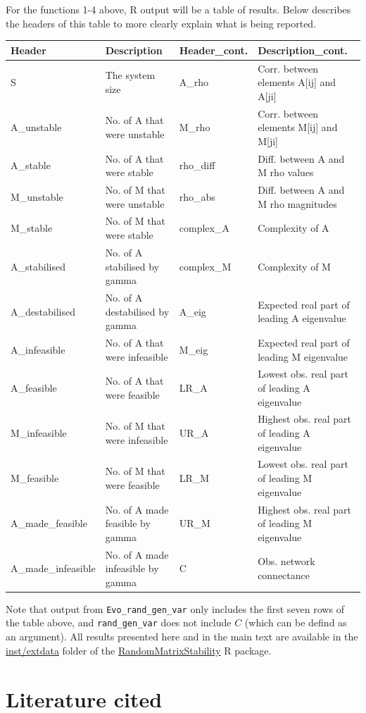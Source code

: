 \documentclass[]{article}
\begin{document}
For the functions 1-4 above, R output will be a table of results. Below
describes the headers of this table to more clearly explain what is
being reported.

\footnotesize

\begin{longtable}[]{@{}llll@{}}
\toprule
Header & Description & Header\_cont. & Description\_cont.\tabularnewline
\midrule
\endhead
S & The system size & A\_rho & Corr. between elements A{[}ij{]} and
A{[}ji{]}\tabularnewline
A\_unstable & No. of A that were unstable & M\_rho & Corr. between
elements M{[}ij{]} and M{[}ji{]}\tabularnewline
A\_stable & No. of A that were stable & rho\_diff & Diff. between A and
M rho values\tabularnewline
M\_unstable & No. of M that were unstable & rho\_abs & Diff. between A
and M rho magnitudes\tabularnewline
M\_stable & No. of M that were stable & complex\_A & Complexity of
A\tabularnewline
A\_stabilised & No. of A stabilised by gamma & complex\_M & Complexity
of M\tabularnewline
A\_destabilised & No. of A destabilised by gamma & A\_eig & Expected
real part of leading A eigenvalue\tabularnewline
A\_infeasible & No. of A that were infeasible & M\_eig & Expected real
part of leading M eigenvalue\tabularnewline
A\_feasible & No. of A that were feasible & LR\_A & Lowest obs. real
part of leading A eigenvalue\tabularnewline
M\_infeasible & No. of M that were infeasible & UR\_A & Highest obs.
real part of leading A eigenvalue\tabularnewline
M\_feasible & No. of M that were feasible & LR\_M & Lowest obs. real
part of leading M eigenvalue\tabularnewline
A\_made\_feasible & No. of A made feasible by gamma & UR\_M & Highest
obs. real part of leading M eigenvalue\tabularnewline
A\_made\_infeasible & No. of A made infeasible by gamma & C & Obs.
network connectance\tabularnewline
\bottomrule
\end{longtable}

\normalsize

Note that output from \texttt{Evo\_rand\_gen\_var} only includes the
first seven rows of the table above, and \texttt{rand\_gen\_var} does
not include \(C\) (which can be defind as an argument). All results
presented here and in the main text are available in the
\href{https://github.com/bradduthie/RandomMatrixStability/tree/master/inst/extdata}{inst/extdata}
folder of the
\href{https://github.com/bradduthie/RandomMatrixStability}{RandomMatrixStability}
R package.

\hypertarget{ref}{\section*{Literature cited}\label{ref}}
\end{document}
